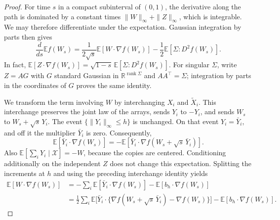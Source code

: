 \documentclass[11pt,letterpaper]{article}
\theoremstyle{remark}
\newcommand{\E}{\mathbb E}
\newcommand{\R}{\mathbb R}
\begin{document}
\begin{proof}
For time $s$ in a compact subinterval of $(0,1)$, the derivative
along the path is dominated by a constant times $\|W\|_\infty+\|Z\|_\infty$,
which is integrable. We may therefore differentiate under the
expectation. Gaussian integration by parts then gives
\begin{equation}\label{ben:slepian-initial}
 \frac d{ds}\E f(W_s)
 =\frac1{2\sqrt s}\E[W\cdot\nabla f(W_s)]
       -\frac12\E[\Sigma:D^2f(W_s)].
\end{equation}
In fact,
$\E[Z\cdot\nabla f(W_s)]
=\sqrt{1-s}\,\E[\Sigma:D^2f(W_s)]$.
For singular $\Sigma$, write $Z=AG$ with $G$ standard Gaussian
in $\R^{\operatorname{rank}\Sigma}$ and $AA^\top=\Sigma$;
integration by parts in the coordinates of $G$ proves the same identity.

We transform the term involving $W$ by interchanging $X_i$ and
$\widetilde X_i$. This interchange preserves the joint law of
the arrays, sends $Y_i$ to $-Y_i$, and sends $W_s$ to
$W_s+\sqrt s\,Y_i$. The event $\{\|Y_i\|_\infty\le h\}$
is unchanged. On that event $Y_i=\bar Y_i$, and off it the
multiplier $\bar Y_i$ is zero. Consequently,
\[
 \E[\bar Y_i\cdot\nabla f(W_s)]
 =-\E[\bar Y_i\cdot\nabla f(W_s+\sqrt s\,\bar Y_i)].
\]
Also $\E[\sum_iY_i\mid\mathcal X]=-W$, because the copies
are centered. Conditioning additionally on the independent $Z$
does not change this expectation. Splitting the increments at $h$
and using the preceding interchange identity yields
\begin{align*}
 \E[W\cdot\nabla f(W_s)]
 &=-\sum_i\E[\bar Y_i\cdot\nabla f(W_s)]
       -\E[b_h\cdot\nabla f(W_s)]\\
 &=\frac12\sum_i\E\big[\bar Y_i\cdot
       \{\nabla f(W_s+\sqrt s\,\bar Y_i)-\nabla f(W_s)\}\big]
       -\E[b_h\cdot\nabla f(W_s)].
\end{align*}


\end{proof}
\end{document}
